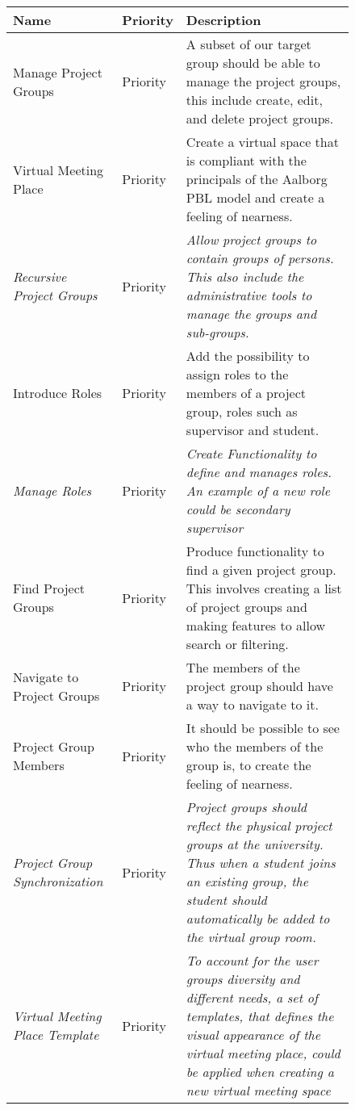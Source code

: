 \begin{figure}%
\begin{tabular}{|p{}|p{}|p{}|}
	\hline
	
	\textbf{Name} & \textbf{Priority} & \textbf{Description} \\
	\hline
	Manage Project Groups & Priority & A subset of our target group should be able to manage the project groups, this include create, edit, and delete project groups.  \\
	\hline
	Virtual Meeting Place & Priority & Create a virtual space that is compliant with the principals of the Aalborg PBL model and create a feeling of nearness.  \\
	\hline
	\textit{Recursive Project Groups} & Priority & \textit{Allow project groups to contain groups of persons. This also include the administrative tools to manage the groups and sub-groups.} \\
	\hline
	Introduce Roles & Priority & Add the possibility to assign roles to the members of a project group, roles such as supervisor and student.   \\
	\hline
	\textit{Manage Roles} & Priority & \textit{Create Functionality to define and manages roles. An example of a new role  could be secondary supervisor} \\
	\hline
	Find Project Groups & Priority & Produce functionality to find a given project group. This involves creating a list of project groups and making features to allow search or filtering. \\
	\hline
	Navigate to Project Groups & Priority & The members of the project group should have a way to navigate to it. \\
	\hline
	Project Group Members & Priority & It should be possible to see who the members of the group is, to create the feeling of nearness. \\
	\hline
	\textit{Project Group Synchronization} & Priority & \textit{Project groups should reflect the physical project groups at the university. Thus when a student joins an existing group, the student should automatically be added to the virtual group room.}  \\
	\hline 
	\textit{Virtual Meeting Place Template} & Priority & \textit{To account for the user groups diversity and different needs, a set of templates, that defines the visual appearance of the virtual meeting place, could be applied when creating a new virtual meeting space }  \\
	\hline 


	
	
	
\end{tabular}
\label{fig:productbacklog}
\end{figure}

\FloatBarrier